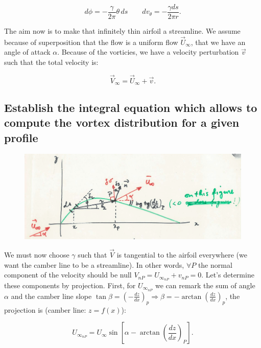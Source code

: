 \documentclass[british,french,11pt, a4paper, openany]{article}
\begin{document}
\begin{equation}
d\phi = -\frac{\gamma}{2\pi} \theta \, ds \qquad dv_\theta = -\frac{\gamma ds}{2\pi r}.
\end{equation}

The aim now is to make that infinitely thin airfoil a streamline. We assume because of superposition that the flow is a uniform flow $\vec{U}_\infty$, that we have an angle of attack $\alpha$. Because of the vorticies, we have a velocity perturbation $\vec{v}$ such that the total velocity is: 

\begin{equation}
\vec{V}_\infty = \vec{U}_\infty + \vec{v}.
\end{equation}

\subsection{Establish the integral equation which allows to compute the vortex distribution for a given profile}

\begin{figure}
	\vspace{-5mm}
	\includegraphics[scale=0.1]{ch2/33}
\end{figure}
We must now choose $\gamma$ such that $\vec{V}$ is tangential to the airfoil everywhere (we want the camber line to be a streamline). In other words, $\forall P$ the normal component of the velocity should be null $V_{nP} = U_{\infty _{nP}} + v_{nP} = 0$. Let's determine these components by projection. First, for $U_{\infty _{nP}}$ we can remark the sum of angle $\alpha$ and the camber line slope $\tan \beta =  \left(-\frac{dz}{dx}\right)_p \Rightarrow \beta = -\arctan \left(\frac{dz}{dx}\right)_p$, the projection is (camber line: $z = f(x)$):

\begin{equation}
U_{\infty _{nP}} = U_\infty \sin \left[ \alpha - \arctan \left(\frac{dz}{dx} \right)_P \right].
\label{eq:2.54}
\end{equation}	 
\end{document}
